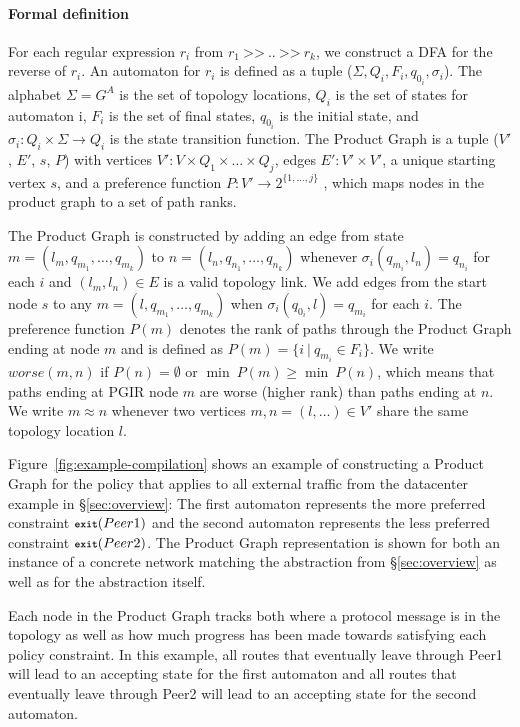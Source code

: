 \documentclass{sig-alternate-10pt}
\newcommand{\para}[1]{\paragraph*{\textbf{#1}}}
\newcommand{\set}[1]{\ensuremath{\{ #1 \} }}
\newcommand{\CD}[1]{\texttt{\small #1}}  %
\newcommand{\KW}[1]{\texttt{\small\bfseries{#1}}}
\newcommand{\True}{\CD{true}}
\newcommand{\Prefer}{\texttt{>>}}
\newcommand{\Path}{\texttt{=>}}
\newcommand{\Exit}{\KW{exit}}
\begin{document}
\para{Formal definition}

For each regular expression $r_i$ from $r_1 ~\Prefer~ .. ~\Prefer~ r_k$, we construct a DFA for the reverse of $r_i$. An automaton for $r_i$ is defined as a tuple ($\Sigma, Q_i, F_i, q_{0_i}, \sigma_i$). The alphabet $\Sigma = G^A$ is the set of topology locations, $Q_i$ is the set of states for automaton i, $F_i$ is the set of final states, $q_{0_i}$ is the initial state, and $\sigma_i \colon Q_i \times \Sigma \rightarrow Q_i$ is the state transition function.
%
The Product Graph is a tuple ($V'$, $E'$, $s$, $P$) with
vertices $V' \colon V \times Q_1 \times \dots \times Q_j$,
edges $E' \colon V' \times V'$,
a unique starting vertex $s$,
and a preference function $P \colon V' \rightarrow 2^{\set{1, \dots, j}}$ , which maps nodes in the product graph to a set of path ranks.

The Product Graph is constructed by adding an edge from state $m = (l_m, q_{m_1}, \dots, q_{m_k})$ to $n = (l_n, q_{n_1}, \dots, q_{n_k})$ whenever $\sigma_i(q_{m_i}, l_n) = q_{n_i}$ for each $i$ and $(l_m,l_n) \in E$ is a valid topology link.
%
We add edges from the start node $s$ to any $m = (l, q_{m_1}, \dots, q_{m_k})$ when $\sigma_i(q_{0_i}, l) = q_{m_i}$ for each $i$.
%
The preference function $P(m)$ denotes the rank of paths through the Product Graph ending at node $m$ and is defined as $P(m) = \set{i~\vert~q_{m_i} \in F_i}$. 
%
We write $worse(m,n)$ if $P(n) = \emptyset$ or $\min ~ P(m) \geq \min ~ P(n)$, which means that paths ending at PGIR node $m$ are worse (higher rank) than paths ending at $n$.
%
We write $m \approx n$ whenever two vertices $m,n = (l, \dots) \in V'$ share the same topology location $l$.


Figure~\ref{fig:example-compilation} shows an example of constructing a Product Graph for the policy that applies to all external traffic from the datacenter example in \S\ref{sec:overview}: 
%
%
The first automaton represents the more preferred constraint $\Exit(Peer1)$ and the second automaton represents the less preferred constraint $\Exit(Peer2)$. The Product Graph representation is shown for both an instance of a concrete network matching the abstraction from \S\ref{sec:overview} as well as for the abstraction itself. 

Each node in the Product Graph tracks both where a protocol message is in the topology as well as how much progress has been made towards satisfying each policy constraint. In this example, all routes that eventually leave through Peer1 will lead to an accepting state for the first automaton and all routes that eventually leave through Peer2 will lead to an accepting state for the second automaton.
\end{document}
